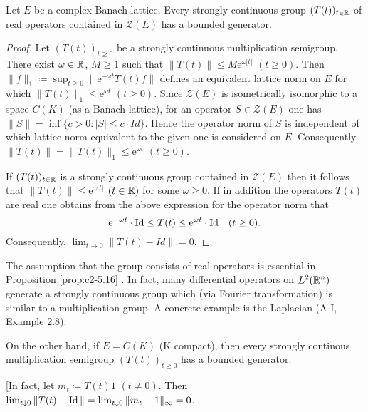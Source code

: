 \begin{proposition}\label{prop:c2-5.16}
%
%
%
Let $E$ be a complex Banach lattice.
Every strongly continuous group $(T(t))_{t \in \mathbb{R}}$ of real operators contained in $\mathcal{Z}(E)$ has a bounded generator.
\end{proposition}
\begin{proof}
Let $(T(t))_{t \geq 0}$ be a strongly continuous multiplication semigroup.
There exist $\omega \in \mathbb{R}$, $M \geq 1$ such that $\|T(t)\| \leq M\mathrm{e}^{\omega|t|}$ $(t \geq 0)$.
Then 
$\|f\|_1 \coloneqq \sup_{t \geq 0}\|\mathrm{e}^{-\omega t}T(t)f\|$ 
defines an equivalent lattice norm on $E$ for which 
$\|T(t)\|_1 \leq \mathrm{e}^{\omega t}$ $(t \geq 0)$.
Since $\mathcal{Z}(E)$ is isometrically isomorphic to a space $C(K)$ (as a Banach lattice), for an operator $S \in \mathcal{Z}(E)$ one has $\|S\| = \inf\{c > 0 \colon |S| \leq c \cdot Id\}$.
Hence the operator norm of $S$ is independent of which lattice norm equivalent to the given one is considered on $E$.
Consequently, $\|T(t)\| = \|T(t)\|_1 \leq \mathrm{e}^{\omega t}$ $(t \geq 0)$.

If $(T(t))_{t \in \mathbb{R}}$ is a strongly continuous group contained in $\mathcal{Z}(E)$ then it follows that $\|T(t)\| \leq \mathrm{e}^{\omega|t|}$ $(t \in \mathbb{R})$ for some $\omega \geq 0$. 
If in addition the operators $T(t)$ are real one obtains from the above expression for the operator norm that 
\[
\mathrm{e}^{- \omega t} \cdot \operatorname{Id} \leq T(t) \leq \mathrm{e}^{\omega t} \cdot \operatorname{Id} \quad (t \geq 0) .
\] 
Consequently, $\lim_{t \to 0}\|T(t) - Id\| = 0$.
\end{proof}

The assumption that the group consists of real operators is essential in Proposition \ref{prop:c2-5.16}  .
In fact, many differential operators on $L^{2}(\mathbb{R}^n)$ generate a strongly continuous group which (via Fourier transformation) is similar to a multiplication group.
A concrete example is the Laplacian (A-I, Example 2.8).

On the other hand, if $E = C(K)$ (K compact), then every strongly continous multiplication semigroup $(T(t))_{t \geq 0}$ has a bounded generator.

[In fact, let $m_t \coloneqq T(t)1$ $(t \neq 0)$.
Then $\lim_{t \downarrow 0}\|T(t) - \operatorname{Id}\| =    \lim_{t \downarrow 0}\|m_t - 1\|_{\infty} = 0$.]

